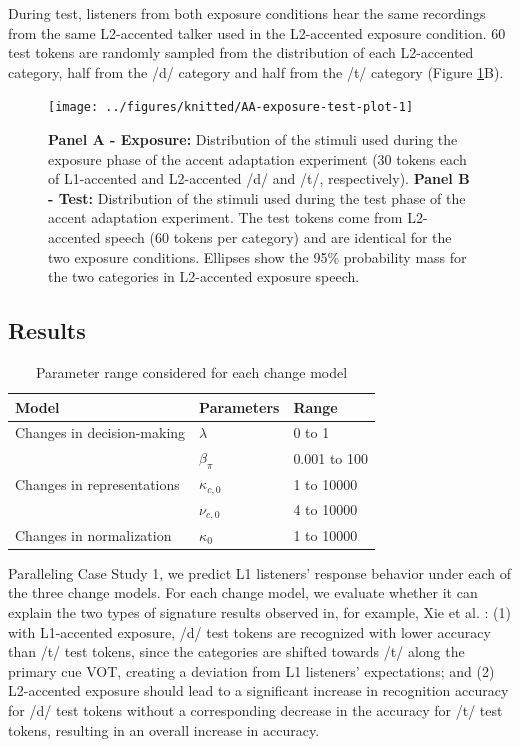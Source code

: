 \documentclass[
  11pt,
  man,floatsintext]{apa6}
\begin{document}
During test, listeners from both exposure conditions hear the same recordings from the same L2-accented talker used in the L2-accented exposure condition. 60 test tokens are randomly sampled from the distribution of each L2-accented category, half from the /d/ category and half from the /t/ category (Figure \ref{fig:AA-exposure-test-plot}B).



\begin{figure}

{\centering \texttt{[image: ../figures/knitted/AA-exposure-test-plot-1]} 

}

\caption{\textbf{Panel A - Exposure:} Distribution of the stimuli used during the exposure phase of the accent adaptation experiment (30 tokens each of L1-accented and L2-accented /d/ and /t/, respectively). \textbf{Panel B - Test:} Distribution of the stimuli used during the test phase of the accent adaptation experiment. The test tokens come from L2-accented speech (60 tokens per category) and are identical for the two exposure conditions. Ellipses show the 95\% probability mass for the two categories in L2-accented exposure speech.}\label{fig:AA-exposure-test-plot}
\end{figure}

\subsection{Results}\label{results-1}

\begin{table}
\centering
\caption{\label{tab:AA-table-models-parameter-setting}Parameter range considered for each change model}
\centering
\begin{tabular}[t]{lll}
\toprule
Model & Parameters & Range\\
\midrule
Changes in decision-making & $\lambda$ & 0 to 1\\
\cmidrule{1-3}
 & $\beta_\pi$ & 0.001 to 100\\
\cmidrule{1-3}
Changes in representations & $\kappa_{c,0}$ & 1 to 10000\\
\cmidrule{1-3}
 & $\nu_{c,0}$ & 4 to 10000\\
\cmidrule{1-3}
Changes in normalization & $\kappa_0$ & 1 to 10000\\
\bottomrule
\end{tabular}
\end{table}

Paralleling Case Study 1, we predict L1 listeners' response behavior under each of the three change models. For each change model, we evaluate whether it can explain the two types of signature results observed in, for example, Xie et al. \autocite*{xie2016jep}: (1) with L1-accented exposure, /d/ test tokens are recognized with lower accuracy than /t/ test tokens, since the categories are shifted towards /t/ along the primary cue VOT, creating a deviation from L1 listeners' expectations; and (2) L2-accented exposure should lead to a significant increase in recognition accuracy for /d/ test tokens without a corresponding decrease in the accuracy for /t/ test tokens, resulting in an overall increase in accuracy.
\end{document}
